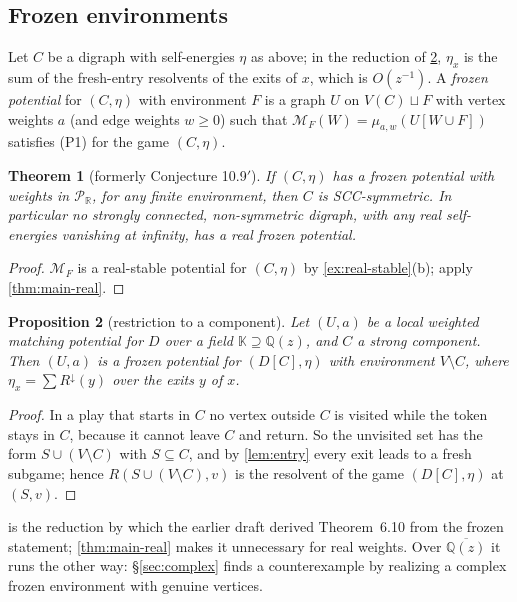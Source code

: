 \documentclass[11pt]{amsart}
\theoremstyle{plain}
\newtheorem{theorem}{Theorem}[section]
\newtheorem{proposition}[theorem]{Proposition}
\theoremstyle{definition}
\theoremstyle{remark}
\numberwithin{equation}{section}
\newcommand{\QQ}{\mathbb{Q}}
\newcommand{\RR}{\mathbb{R}}
\newcommand{\Qz}{\QQ(z)}
\newcommand{\Qzbar}{\overline{\QQ(z)}}
\newcommand{\Puis}{\mathcal{P}_{\RR}}
\newcommand{\Mpot}{\mathcal{M}}           %
\newcommand{\Rdown}{R^{\downarrow}}
\begin{document}
\subsection{Frozen environments}
Let $C$ be a digraph with self-energies $\eta$ as above; in the reduction of \cref{prop:restriction}, $\eta_x$ is the sum of the fresh-entry resolvents of the exits of $x$, which is $O(z^{-1})$. A \emph{frozen potential} for $(C,\eta)$ with environment $F$ is a graph $U$ on $V(C)\sqcup F$ with vertex weights $a$ (and edge weights $w\ge0$) such that $\Mpot_F(W)=\mu_{a,w}(U[W\cup F])$ satisfies \textup{(P1)} for the game $(C,\eta)$.

\begin{theorem}[formerly Conjecture 10.9$'$]\label{thm:frozen-real}
If $(C,\eta)$ has a frozen potential with weights in $\Puis$, for any finite environment, then $C$ is SCC-symmetric. In particular no strongly connected, non-symmetric digraph, with any real self-energies vanishing at infinity, has a real frozen potential.
\end{theorem}
\begin{proof}
$\Mpot_F$ is a real-stable potential for $(C,\eta)$ by \cref{ex:real-stable}(b); apply \cref{thm:main-real}.
\end{proof}

\begin{proposition}[restriction to a component]\label{prop:restriction}
Let $(U,a)$ be a local weighted matching potential for $D$ over a field $\mathbb K\supseteq\Qz$, and $C$ a strong component. Then $(U,a)$ is a frozen potential for $(D[C],\eta)$ with environment $V\setminus C$, where $\eta_x=\sum\Rdown(y)$ over the exits $y$ of $x$.
\end{proposition}
\begin{proof}
In a play that starts in $C$ no vertex outside $C$ is visited while the token stays in $C$, because it cannot leave $C$ and return. So the unvisited set has the form $S\cup(V\setminus C)$ with $S\subseteq C$, and by \cref{lem:entry} every exit leads to a fresh subgame; hence $R(S\cup(V\setminus C),v)$ is the resolvent of the game $(D[C],\eta)$ at $(S,v)$.
\end{proof}

 is the reduction by which the earlier draft derived Theorem~6.10 from the frozen statement; \cref{thm:main-real} makes it unnecessary for real weights. Over $\Qzbar$ it runs the other way: \S\ref{sec:complex} finds a counterexample by realizing a complex frozen environment with genuine vertices.
\end{document}
